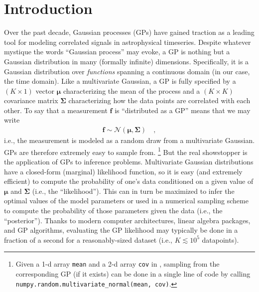 \documentclass[modern]{aastex62}
\begin{document}
\section{Introduction}
\label{sec:intro}

Over the past decade, Gaussian processes (GPs) have gained traction as
a leading tool for modeling correlated signals in astrophysical timeseries.
Despite whatever mystique the words ``Gaussian process'' may evoke, a GP
is nothing but a Gaussian distribution in many (formally infinite)
dimensions. Specifically, it is a Gaussian distribution over
\emph{functions} spanning a continuous domain (in our case, the time domain).
Like a multivariate
Gaussian, a GP is fully specified by a $(K \times 1)$ vector $\pmb{\mu}$ characterizing
the mean of the process and a $(K \times K)$
covariance matrix $\pmb{\Sigma}$ characterizing how the data points
are correlated with each other. To say that a measurement $\mathbf{f}$ is
``distributed as a GP'' means that we may write
%
\begin{align}
    \mathbf{f} \sim \mathcal{N}\left( \pmb{\mu}, \pmb{\Sigma} \right)
    \quad,
\end{align}
%
i.e., the measurement is modeled as a random draw from a multivariate Gaussian.
GPs are therefore extremely easy to sample from.%
\footnote{Given a 1-d array \texttt{mean} and a 2-d array \texttt{cov} in \Python,
    sampling from the corresponding GP (if it exists)
    can be done in a single line of code by calling
    \texttt{numpy.random.multivariate\_normal(mean, cov)}.}
But the real showstopper is the application of GPs to inference problems.
Multivariate Gaussian distributions have a closed-form (marginal) likelihood
function, so it is easy (and extremely efficient) to compute the probability
of one's data conditioned on a given value of $\pmb{\mu}$ and $\pmb{\Sigma}$
(i.e., the ``likelihood''). This can in turn be maximized
to infer the optimal values of the model parameters
or used in a
numerical sampling scheme to compute the probability of those parameters
given the data (i.e., the ``posterior'').
Thanks to modern computer architectures, linear algebra packages, and
GP algorithms,
evaluating the GP likelihood may typically be done in a fraction of a second
for a reasonably-sized dataset (i.e., $K \lesssim 10^5$ datapoints).
\end{document}
